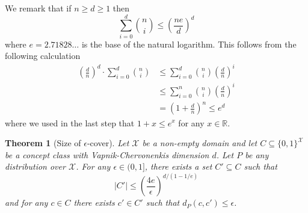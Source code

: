 \documentclass[11pt]{article}
\newtheorem{theorem}[proposition]{Theorem}
\newcommand{\R}{\mathbb{R}}
\newcommand{\X}{\mathcal{X}}
\begin{document}
We remark that if $n \ge d \ge 1$ then
\begin{equation}
\label{equation:sauer-lemma-estimate}
\sum_{i=0}^d \binom{n}{i} \le \left( \frac{ne}{d} \right)^d
\end{equation}
where $e = 2.71828 \dots$ is the base of the natural logarithm. This follows
from the following calculation
\begin{align*}
\left( \frac{d}{n} \right)^d \cdot \sum_{i=0}^d \binom{n}{i}
& \le \sum_{i=0}^d \binom{n}{i} \left( \frac{d}{n} \right)^i \\
& \le \sum_{i=0}^n \binom{n}{i} \left( \frac{d}{n} \right)^i \\
& = \left(1 + \frac{d}{n} \right)^n \le e^d
\end{align*}
where we used in the last step that $1 + x \le e^x$ for any $x \in \R$.

\begin{theorem}[Size of $\epsilon$-cover]
Let $\X$ be a non-empty domain and let $C \subseteq \{0,1\}^\X$ be a concept
class with Vapnik-Chervonenkis dimension $d$. Let $P$ be any distribution over
$\X$. For any $\epsilon \in (0,1]$, there exists a set $C' \subseteq C$ such that
\begin{equation}
\label{equation:theorem-epsilon-cover}
|C'| \le \left( \frac{4e}{\epsilon} \right)^{d/(1-1/e)}
\end{equation}
and for any $c \in C$ there exists $c' \in C'$ such that $d_P(c,c') \le \epsilon$.
\end{theorem}
\end{document}
